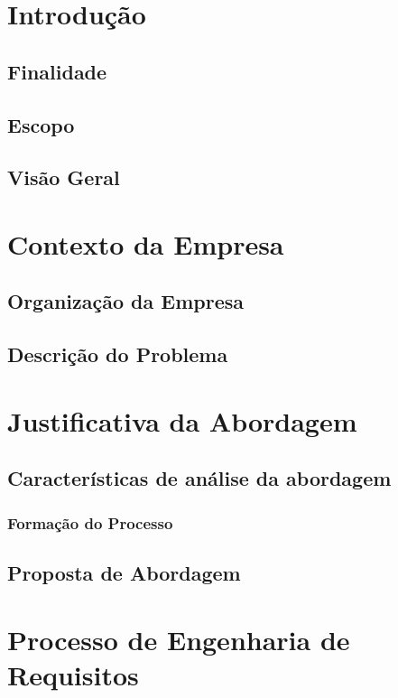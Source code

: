 \section{Introdução}\label{intr}

  \subsection{Finalidade}
  \subsection{Escopo}
  \subsection{Visão Geral}

\section{Contexto da Empresa}\label{cont}

  \subsection{Organização da Empresa}
  \subsection{Descrição do Problema}

\newpage

\section{Justificativa da Abordagem}\label{just}

  \subsection{Características de análise da abordagem}
    \subsubsection{Formação do Processo}
  \subsection{Proposta de Abordagem}

\newpage

\section{Processo de Engenharia de Requisitos}\label{proc}

